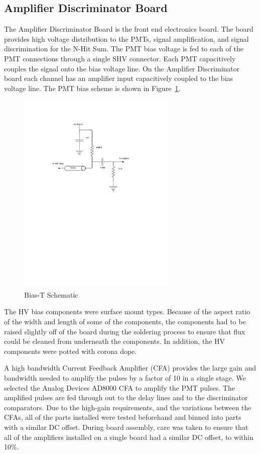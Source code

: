 \documentclass{JINST}
\begin{document}
\subsection{Amplifier Discriminator Board}
\label{sec:Amp-Disc}
%
The Amplifier Discriminator Board is the front end electronics board.
The board provides high voltage distribution to the PMTs, signal
amplification, and signal discrimination for the N-Hit Sum.  The PMT
bias voltage is fed to each of the PMT connections through a single
SHV connector.  Each PMT capacitively couples the signal onto the bias
voltage line.  On the Amplifier Discriminator board each channel has
an amplifier input capacitively coupled to the bias voltage line.  The
PMT bias scheme is shown in Figure~\ref{fig:bias}.

\begin{figure}[ht]
\begin{center}
\includegraphics[width=3in, keepaspectratio=true, trim=1.5in 5.5in 2in 1.25in, clip=true]{graphics/bias}
\caption{Bias-T Schematic}
\label{fig:bias}
\end{center}
\end{figure}

The HV bias components were surface mount types.  Because of the
aspect ratio of the width and length of some of the components, the
components had to be raised slightly off of the board during the
soldering process to ensure that flux could be cleaned from underneath
the components.  In addition, the HV components were potted with
corona dope.

A high bandwidth Current Feedback Amplifier (CFA) provides the large
gain and bandwidth needed to amplify the pulses by a factor of 10 in a
single stage.  We selected the Analog Devices AD8000 CFA to amplify
the PMT pulses.  The amplified pulses are fed through out to the delay
lines and to the discriminator comparators.  Due to the high-gain
requirements, and the variations between the CFAs, all of the parts
installed were tested beforehand and binned into parts with a similar
DC offset.  During board assembly, care was taken to ensure that all
of the amplifiers installed on a single board had a similar DC offset,
to within 10\%.
\end{document}
